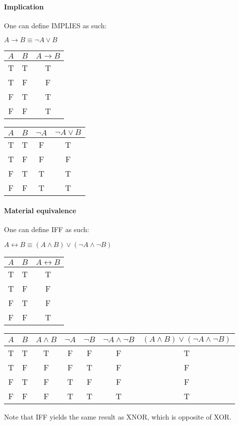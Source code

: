 \documentclass[11pt]{article}
\begin{document}
\paragraph*{Implication} 
One can define IMPLIES as such:
\begin{center}
    \(A \rightarrow B \equiv \neg A \vee B\)
\end{center}
\begin{center}
    \begin{tabular}{|c|c|c|}
        \hline
        \(A\) & \(B\) & \(A \rightarrow B\) \\
        \hline
        T & T & T \\
        T & F & F \\
        F & T & T \\
        F & F & T \\
        \hline    
    \end{tabular}
    \begin{tabular}{|c|c|c|c|}
        \hline
        \(A\) & \(B\) & \(\neg A\) & \(\neg A \vee B\) \\
        \hline
        T & T & F & T \\
        T & F & F & F \\
        F & T & T & T \\
        F & F & T & T \\
        \hline       
    \end{tabular}
\end{center}
\paragraph*{Material equivalence}
One can define IFF as such:
\begin{center}
    \(A \leftrightarrow B \equiv (A \wedge B)\vee(\neg A \wedge \neg B)\)
\end{center}
\begin{center}
    \begin{tabular}{|c|c|c|}
        \hline
        \(A\) & \(B\) & \(A \leftrightarrow B\) \\
        \hline
        T & T & T \\
        T & F & F \\
        F & T & F \\
        F & F & T \\
        \hline
    \end{tabular}
    \begin{tabular}{|c|c|c|c|c|c|c|}
        \hline
        \(A\) & \(B\) & \(A \wedge B\) & \(\neg A\) & \(\neg B\) & \(\neg A \wedge \neg B\) & \((A \wedge B)\vee(\neg A \wedge \neg B)\) \\
        \hline
        T & T & T & F & F & F & T \\
        T & F & F & F & T & F & F \\
        F & T & F & T & F & F & F \\
        F & F & F & T & T & T & T \\
        \hline
    \end{tabular} 
\end{center}
Note that IFF yields the same result as XNOR, which is opposite of XOR.
\end{document}
